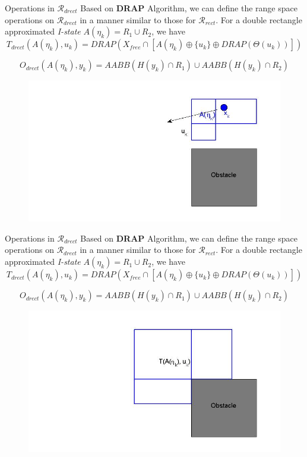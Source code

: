 \begin{frame}{Operations in $\mathcal{R}_{drect}$}
  Based on \textbf{DRAP} Algorithm, we can define the range space operations on
  $\mathcal{R}_{drect}$ in a manner similar to those for $\mathcal{R}_{rect}$.
  For a double rectangle approximated \emph{I-state} $A(\eta_k) = R_1 \cup R_2$,
  we have
$$ T_{drect}(A(\eta_k), u_k) = DRAP(X_{free} \cap [A(\eta_k) \oplus \{ u_k \} \oplus DRAP(\Theta(u_k))])$$

  $$O_{drect}(A(\eta_k), y_k) = AABB(H(y_k) \cap R_1)\cup AABB(H(y_k) \cap R_2)$$
  \begin{figure}
    \includegraphics[scale=0.3]{figs/drectevolve1.jpg}
  \end{figure}
\end{frame}

\begin{frame}{Operations in $\mathcal{R}_{drect}$}
  Based on \textbf{DRAP} Algorithm, we can define the range space operations on
  $\mathcal{R}_{drect}$ in a manner similar to those for $\mathcal{R}_{rect}$.
  For a double rectangle approximated \emph{I-state} $A(\eta_k) = R_1 \cup R_2$,
  we have
$$ T_{drect}(A(\eta_k), u_k) = DRAP(X_{free} \cap [A(\eta_k) \oplus \{ u_k \} \oplus DRAP(\Theta(u_k))])$$

  $$O_{drect}(A(\eta_k), y_k) = AABB(H(y_k) \cap R_1)\cup AABB(H(y_k) \cap R_2)$$
  \begin{figure}
    \includegraphics[scale=0.3]{figs/drectevolve2.jpg}
  \end{figure}
\end{frame}

